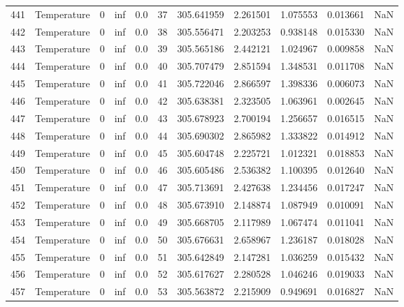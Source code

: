 \begin{tabular}{llrrrrrrrrr}
441 &  Temperature &       0 &  inf &  0.0 &   37 &  305.641959 &  2.261501 &  1.075553 &   0.013661 &      NaN \\
442 &  Temperature &       0 &  inf &  0.0 &   38 &  305.556471 &  2.203253 &  0.938148 &   0.015330 &      NaN \\
443 &  Temperature &       0 &  inf &  0.0 &   39 &  305.565186 &  2.442121 &  1.024967 &   0.009858 &      NaN \\
444 &  Temperature &       0 &  inf &  0.0 &   40 &  305.707479 &  2.851594 &  1.348531 &   0.011708 &      NaN \\
445 &  Temperature &       0 &  inf &  0.0 &   41 &  305.722046 &  2.866597 &  1.398336 &   0.006073 &      NaN \\
446 &  Temperature &       0 &  inf &  0.0 &   42 &  305.638381 &  2.323505 &  1.063961 &   0.002645 &      NaN \\
447 &  Temperature &       0 &  inf &  0.0 &   43 &  305.678923 &  2.700194 &  1.256657 &   0.016515 &      NaN \\
448 &  Temperature &       0 &  inf &  0.0 &   44 &  305.690302 &  2.865982 &  1.333822 &   0.014912 &      NaN \\
449 &  Temperature &       0 &  inf &  0.0 &   45 &  305.604748 &  2.225721 &  1.012321 &   0.018853 &      NaN \\
450 &  Temperature &       0 &  inf &  0.0 &   46 &  305.605486 &  2.536382 &  1.100395 &   0.012640 &      NaN \\
451 &  Temperature &       0 &  inf &  0.0 &   47 &  305.713691 &  2.427638 &  1.234456 &   0.017247 &      NaN \\
452 &  Temperature &       0 &  inf &  0.0 &   48 &  305.673910 &  2.148874 &  1.087949 &   0.010091 &      NaN \\
453 &  Temperature &       0 &  inf &  0.0 &   49 &  305.668705 &  2.117989 &  1.067474 &   0.011041 &      NaN \\
454 &  Temperature &       0 &  inf &  0.0 &   50 &  305.676631 &  2.658967 &  1.236187 &   0.018028 &      NaN \\
455 &  Temperature &       0 &  inf &  0.0 &   51 &  305.642849 &  2.147281 &  1.036259 &   0.015432 &      NaN \\
456 &  Temperature &       0 &  inf &  0.0 &   52 &  305.617627 &  2.280528 &  1.046246 &   0.019033 &      NaN \\
457 &  Temperature &       0 &  inf &  0.0 &   53 &  305.563872 &  2.215909 &  0.949691 &   0.016827 &      NaN \\

\end{tabular}
